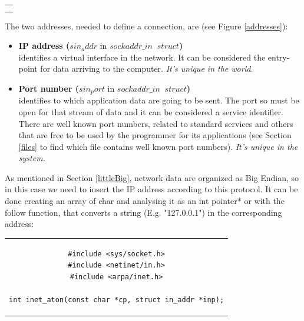 \begin{center}
\begin{tabular}{c}
\begin{lstlisting}[linewidth=350pt, basicstyle=\footnotesize\sffamily,]
#include <netinet/in.h>

struct sockaddr_in {
    sa_family_t    sin_family; /* address family: AF_INET */
    in_port_t      sin_port;   /* port in network byte order */
    struct in_addr sin_addr;   /* internet address */
};

/* Internet address. */
struct in_addr {
    uint32_t       s_addr;     /* address in network byte order */
};\\
\end{lstlisting}
\end{tabular}
\end{center}
The two addresses, needed to define a connection, are (see Figure \ref{addresses}):
\begin{itemize}
\item{\textbf{IP address (}$sin_addr$ in $sockaddr\_in\;\;struct$\textbf{)}\\
identifies a virtual interface in the network. It can be considered the entry-point for data arriving to the computer. \textit{It's unique in the world.}
}
\item{\textbf{Port number (}$sin_port$ in $sockaddr\_in\;\;struct$\textbf{)}\\
identifies to which application data are going to be sent. The port so must be open for that stream of data and it can be considered a service identifier. There are well known port numbers, related to standard services and others that are free to be used by the programmer for its applications (see Section \ref{files} to find which file contains well known port numbers). \textit{It's unique in the system.}
}
\end{itemize}
As mentioned in Section \ref{littleBig}, network data are organized as Big Endian, so in this case we need to insert the IP address according to this protocol. It can be done creating an array of char and analysing it as an int pointer* or with the follow function, that converts a string (E.g. "127.0.0.1") in the corresponding address:
\begin{center}
\begin{tabular}{c}
\begin{lstlisting}[linewidth=280pt, basicstyle=\footnotesize\sffamily,]
#include <sys/socket.h>
#include <netinet/in.h>
#include <arpa/inet.h>

int inet_aton(const char *cp, struct in_addr *inp);
\end{lstlisting}
\end{tabular}
\end{center}
